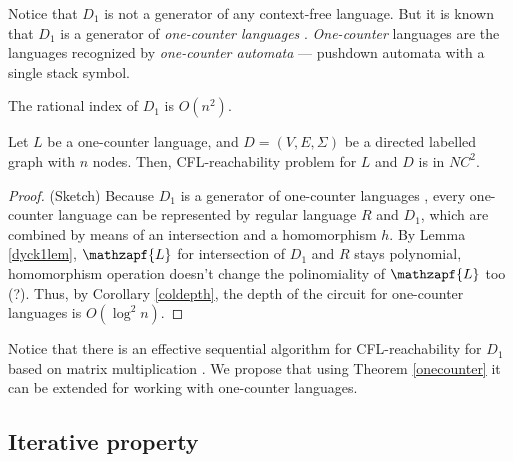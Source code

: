 Notice that $D_1$ is not a generator of any context-free language. But it is known that $D_1$ is a generator of \textit{one-counter languages} \cite{GreibHier}. \textit{One-counter} languages are the languages recognized by \textit{one-counter automata} --- pushdown automata with a single stack symbol. 
\begin{lemma}
\label{dyck1lem}
The rational index of $D_1$ is $O(n^2)$.
\end{lemma}
\begin{theorem}
\label{onecounter}
Let $L$ be a one-counter language, and $D=(V, E, \Sigma)$ be a directed labelled graph with $n$ nodes. Then, CFL-reachability problem for $L$ and $D$ is in $NC^2$.
\end{theorem}
\begin{proof} (Sketch)
Because $D_1$ is a generator of one-counter languages \cite{GreibHier}, every one-counter language can be represented by regular language $R$ and $D_1$, which are combined by means of an intersection and a homomorphism $h$. By Lemma \ref{dyck1lem}, $\mathzapf{L}$ for intersection of $D_1$ and $R$ stays polynomial, homomorphism operation doesn't change the polinomiality of $\mathzapf{L}$ too (?). Thus, by Corollary \ref{coldepth}, the depth of the circuit for one-counter languages is $O(\log^2 n)$.
\end{proof}


Notice that there is an effective sequential algorithm for CFL-reachability for $D_1$ based on matrix multiplication \cite{Bradford}. We propose that using Theorem \ref{onecounter} it can be extended for working with one-counter languages.

\subsection{Iterative property}







%
%



